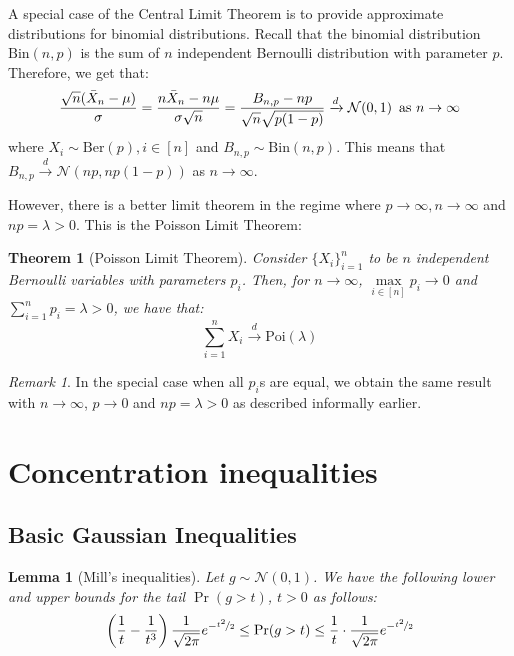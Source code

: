 \documentclass{article}
\newtheorem{theorem}{Theorem}[subsection]
\newtheorem{lemma}{Lemma}[subsection]
\theoremstyle{remark}
\newtheorem*{remark}{Remark}
\newcommand{\calN}{\mathcal{N}}
\begin{document}
A special case of the Central Limit Theorem is to provide approximate distributions for binomial distributions. Recall that the binomial distribution \(\mathrm{Bin}(n, p)\) is the sum of \(n\) independent Bernoulli distribution with parameter \(p\). Therefore, we get that:
\begin{equation*}
\frac{\sqrt{n}(\bar{X}_{n} - \mu)}{\sigma} = \frac{n\bar{X}_{n} - n\mu}{\sigma\sqrt{n}} = \frac{B_{n, p} - np}{\sqrt{n}\sqrt{p(1 - p)}} \xrightarrow{d} \calN(0, 1) \enskip \text{as } n \to \infty
\end{equation*}
where \(X_{i} \sim \mathrm{Ber}(p), i \in [n]\) and \(B_{n, p} \sim \mathrm{Bin}(n, p)\). This means that \(B_{n, p} \xrightarrow{d} \calN(np, np(1 - p))\) as \(n \to \infty\).

However, there is a better limit theorem in the regime where \(p \to \infty, n \to \infty\) and \(np = \lambda > 0\). This is the Poisson Limit Theorem:
\begin{theorem}[Poisson Limit Theorem]
\label{thm:plt}
Consider \(\{X_{i}\}_{i=1}^{n}\) to be \(n\) independent Bernoulli variables with parameters \(p_{i}\). Then, for \(n \to \infty\), \(\max\limits_{i \in [n]} p_{i} \to 0\) and \(\sum\limits_{i=1}^{n}p_{i} = \lambda > 0\), we have that:
\begin{equation*}
\sum_{i=1}^{n}X_{i} \xrightarrow{d} \mathrm{Poi}(\lambda)
\end{equation*}
\end{theorem}

\begin{remark}
In the special case when all \(p_{i}\)s are equal, we obtain the same result with \(n \to \infty\), \(p \to 0\) and \(np = \lambda > 0\) as described informally earlier.
\end{remark}

\newpage

\section{Concentration inequalities}
\subsection{Basic Gaussian Inequalities}
\begin{lemma}[Mill's inequalities]
Let \(g \sim \calN(0, 1)\). We have the following lower and upper bounds for the tail \(\Pr(g > t)\), \(t > 0\) as follows:
\begin{equation*}
\left(\frac{1}{t} - \frac{1}{t^{3}}\right)\frac{1}{\sqrt{2\pi}}e^{-\nicefrac{t^{2}}{2}} \leq \Pr(g > t) \leq \frac{1}{t}\cdot\frac{1}{\sqrt{2\pi}}e^{-\nicefrac{t^{2}}{2}}
\end{equation*}
\end{lemma}
\end{document}
